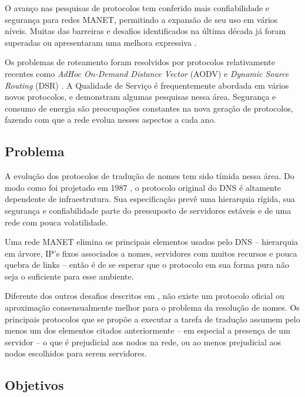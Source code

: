 O avanço nas pesquisas de protocolos tem conferido mais confiabilidade e segurança
para redes MANET, permitindo a expansão de seu uso em vários níveis. Muitas das
barreiras e desafios identificados na última década já foram superadas ou apresentaram
uma melhora expressiva \cite{manet-state}.

Os problemas de roteamento foram resolvidos por protocolos relativamente recentes
como \textit{AdHoc On-Demand Distance Vector} (AODV) \cite{aodv} e
\textit{Dynamic Source Routing} (DSR) \cite{dsr}. A Qualidade de Serviço é
frequentemente abordada em vários novos protocolos, \cite{qos1} e \cite{qos2}
demonstram algumas pesquisas nessa área. Segurança e consumo de energia são
preocupações constantes na nova geração de protocolos, fazendo com que a rede
evolua nesses aspectos a cada ano.

\subsection{Problema}

A evolução dos protocolos de tradução de nomes tem sido tímida nessa área. Do
modo como foi projetado em 1987 \cite{rfc1035}, o protocolo original do DNS é
altamente dependente de infraestrutura. Sua especificação prevê uma hierarquia rígida,
sua segurança e confiabilidade parte do pressuposto de servidores estáveis e de
uma rede com pouca volatilidade.

Uma rede MANET elimina os principais elementos usados pelo DNS -- hierarquia em
árvore, IP's fixos associados a nomes, servidores com muitos recursos e pouca
quebra de links -- então é de se esperar que o protocolo em sua forma pura não
seja o suficiente para esse ambiente.

Diferente dos outros desafios descritos em \cite{manet-state}, não existe um
protocolo oficial ou aproximação consensualmente melhor para o problema da
resolução de nomes. Os principais protocolos que se propõe a executar a tarefa
de tradução assumem pelo menos um dos elementos citados anteriormente -- em
especial a presença de um servidor -- o que é prejudicial aos nodos na rede, ou
ao menos prejudicial aos nodos escolhidos para serem servidores.

\subsection{Objetivos}


